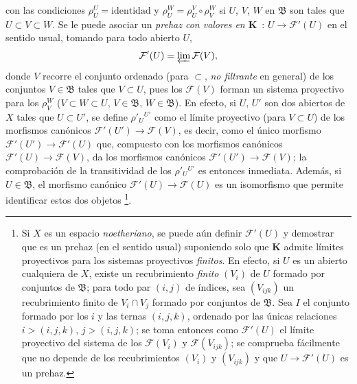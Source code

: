 \begin{env}[3.2.1]
con las condiciones $\rho_U^U=\text{identidad}$ y
$\rho_U^W=\rho_U^V\circ\rho_V^W$ si $U$, $V$, $W$ en $\mathfrak{B}$ son
tales que $U\subset V\subset W$. Se le puede asociar un \emph{prehaz con
valores en $\boldsymbol{K}$}~: $U\to\mathcal{F}'(U)$ en el sentido usual, tomando
para todo abierto $U$,
\[
  \mathcal{F}'(U)=\varprojlim\mathcal{F}(V),
\]
donde $V$ recorre el conjunto ordenado (para $\subset$, \emph{no filtrante} en
general) de los conjuntos $V\in\mathfrak{B}$ tales que $V\subset U$, pues los
$\mathcal{F}(V)$ forman un sistema proyectivo para los $\rho_V^W$
($V\subset W\subset U$, $V\in\mathfrak{B}$, $W\in\mathfrak{B}$). En efecto,
si $U$, $U'$ son dos abiertos de $X$ tales que $U\subset U'$, se define
$\rho'_U{}^{U'}$ como el límite proyectivo (para $V\subset U$) de los morfismos
canónicos $\mathcal{F}'(U')\to\mathcal{F}(V)$, es decir, como el único
morfismo $\mathcal{F}'(U')\to\mathcal{F}'(U)$ que, compuesto con los
morfismos canónicos $\mathcal{F}'(U)\to\mathcal{F}(V)$, da los morfismos
canónicos $\mathcal{F}'(U')\to\mathcal{F}(V)$; la comprobación de la
transitividad de los $\rho'_U{}^{U'}$ es entonces inmediata. Además, si
$U\in\mathfrak{B}$, el morfismo canónico
$\mathcal{F}'(U)\to\mathcal{F}(U)$ es un isomorfismo que permite identificar
estos dos objetos%
\footnote{Si $X$ es un espacio \emph{noetheriano}, se puede aún definir
$\mathcal{F}'(U)$ y demostrar que es un prehaz (en el sentido usual)
suponiendo solo que $\boldsymbol{K}$ admite límites proyectivos
para los sistemas proyectivos \emph{finitos}. En efecto, si $U$ es un abierto
cualquiera de $X$, existe un recubrimiento \emph{finito} $(V_i)$ de $U$ formado
por conjuntos de $\mathfrak{B}$; para todo par $(i,j)$ de índices, sea
$(V_{ijk})$ un recubrimiento finito de $V_i\cap V_j$ formado por conjuntos de
$\mathfrak{B}$. Sea $I$ el conjunto formado por los $i$ y las ternas $(i,j,k)$,
ordenado por las únicas relaciones $i>(i,j,k)$, $j>(i,j,k)$; se toma entonces
como $\mathcal{F}'(U)$ el límite proyectivo del sistema de los $\mathcal{F}(V_i)$
y $\mathcal{F}(V_{ijk})$; se comprueba fácilmente que no depende de los
recubrimientos $(V_i)$ y $(V_{ijk})$ y que $U\to\mathcal{F}'(U)$ es un
prehaz.}.
\end{env}
